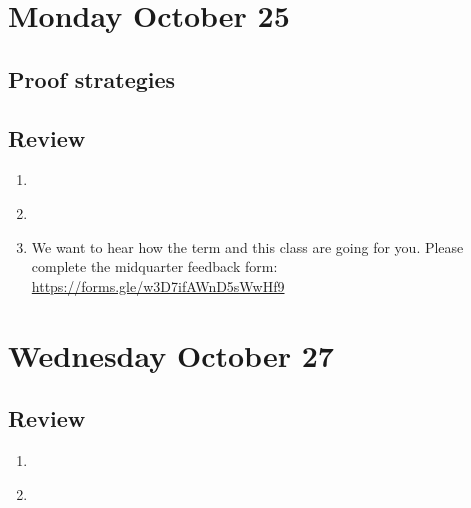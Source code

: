 

\section*{Monday October 25}
\subsection*{Proof strategies}




\newpage






\newpage

\vfill

\newpage
\subsection*{Review}
\begin{enumerate}
\item \hspace{1in}\\ 
\item \hspace{1in}\\ 
\item We want to hear how the term and this class are going for you.
Please complete the midquarter feedback form: \href{https://forms.gle/w3D7ifAWnD5sWwHf9}{https://forms.gle/w3D7ifAWnD5sWwHf9}
\end{enumerate}

\newpage
\section*{Wednesday October 27}

\newpage

\newpage
\subsection*{Review}
\begin{enumerate}
\item \hspace{1in}\\ 
\item \hspace{1in}\\ 
\end{enumerate}

